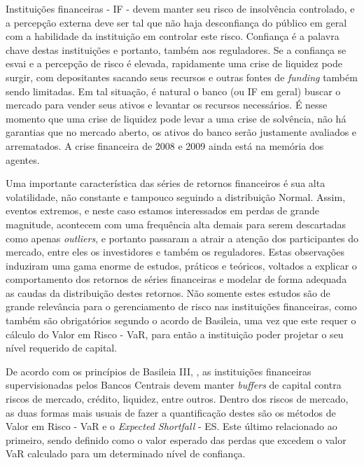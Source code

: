 \documentclass[review]{elsarticle}
\theoremstyle{definition}
\begin{document}
Instituições financeiras - IF - devem manter seu risco de insolvência controlado, e a percepção externa deve ser tal que não haja desconfiança do público em geral com a habilidade da instituição em controlar este risco. Confiança é a palavra chave destas instituições e portanto, também aos reguladores. Se a confiança se esvai e a percepção de risco é elevada, rapidamente uma crise de liquidez pode surgir, com depositantes sacando seus recursos e outras fontes de \emph{funding} também sendo limitadas. Em tal situação, é natural o banco (ou IF em geral) buscar o mercado para vender seus ativos e levantar os recursos necessários. É nesse momento que uma crise de liquidez pode levar a uma crise de solvência, não há garantias que no mercado aberto, os ativos do banco serão justamente avaliados e arrematados. A crise financeira de 2008 e 2009 ainda está na memória dos agentes.

Uma importante característica das séries de retornos financeiros é sua alta volatilidade, não constante e tampouco seguindo a distribuição Normal. Assim, eventos extremos, e neste caso estamos interessados em perdas de grande magnitude, acontecem com uma frequência alta demais para serem descartadas como apenas \emph{outliers}, e portanto passaram a atrair a atenção dos participantes do mercado, entre eles os investidores e também os reguladores. Estas observações induziram uma gama enorme de estudos, práticos e teóricos, voltados a explicar o comportamento dos retornos de séries financeiras e modelar de forma adequada as caudas da distribuição destes retornos. Não somente estes estudos são de grande relevância para o gerenciamento de risco nas instituições financeiras, como também são obrigatórios segundo o acordo de Basileia, uma vez que este requer o cálculo do Valor em Risco - VaR, para então a instituição poder projetar o seu nível requerido de capital. 

De acordo com os princípios de Basileia III, \cite{BankingSupervision2011, BankingSupervision2013, BankingSupervision2014}, as instituições financeiras supervisionadas pelos Bancos Centrais devem manter \emph{buffers} de capital contra riscos de mercado, crédito, liquidez, entre outros. Dentro dos riscos de mercado, as duas formas mais usuais de fazer a quantificação destes são os métodos de Valor em Risco - VaR e o \emph{Expected Shortfall} - ES. Este último relacionado ao primeiro, sendo definido como o valor esperado das perdas que excedem o valor VaR calculado para um determinado nível de confiança.
\end{document}
